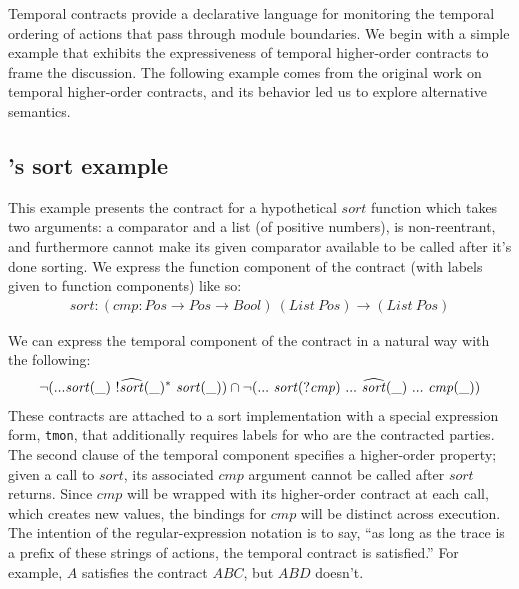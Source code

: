 Temporal contracts provide a declarative language for monitoring the temporal ordering of actions that pass through module boundaries.
%
We begin with a simple example that exhibits the expressiveness of temporal higher-order contracts to frame the discussion.
%
The following example comes from the original work on temporal higher-order contracts, and its behavior led us to explore alternative semantics.
%
\newcommand{\sortid}{\mathit{sort}}
\subsection{\dfm's sort example} \label{sec:sort}
%
This example presents the contract for a hypothetical $\sortid$ function which takes two arguments: a comparator and a list (of positive numbers), is non-reentrant, and furthermore cannot make its given comparator available to be called after it's done sorting.
%
We express the function component of the contract (with labels given to function components) like so:
\begin{align*}
  \sortid : (\mathit{cmp} : \mathit{Pos} \to \mathit{Pos} \to \mathit{Bool})\ (List\ Pos) \to (List\ Pos)
\end{align*}

We can express the temporal component of the contract in a natural way with the following:
\renewcommand*{\arraystretch}{1.2}
\newcommand*{\call}[1]{\scallev{#1}{\_}}
\newcommand*{\ret}[1]{\sretev{#1}{\_}}
\begin{align*}
 \stnot{(\sddd \sortid(\_)~ \stmany{\snonevent{\retof{\sortid}(\_)}}~ \sortid(\_))}
 \cap \stnot{(\sddd~ \sortid(?\mathit{cmp})~ \sddd~ \retof{\sortid}(\_)~ \sddd~ \mathit{cmp}(\_))}
\end{align*}
%
These contracts are attached to a sort implementation with a special expression form, {\tt tmon}, that additionally requires labels for who are the contracted parties.
%
The second clause of the temporal component specifies a higher-order property; given a call to $\sortid$, its associated $\mathit{cmp}$ argument cannot be called after $\sortid$ returns.
%
Since $\mathit{cmp}$ will be wrapped with its higher-order contract at each call, which creates new values, the bindings for $\mathit{cmp}$ will be distinct across execution.
%
The intention of the regular-expression notation is to say, ``as long as the trace is a prefix of these strings of actions, the temporal contract is satisfied.''
%
For example, $A$ satisfies the contract $ABC$, but $ABD$ doesn't.

